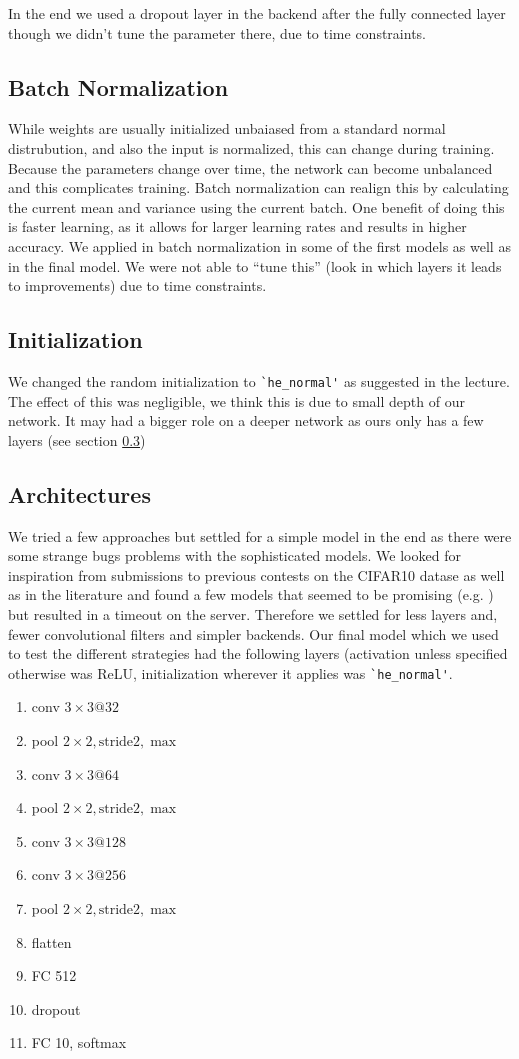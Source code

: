 In the end we used a dropout layer in the backend after the fully connected layer though we didn't tune the parameter there, due to time constraints. 
\subsection{Batch Normalization}
While weights are usually initialized unbaiased from a standard normal distrubution, and also the input is normalized, this can change during training. Because the parameters change over time, the network can become unbalanced and this complicates training.
Batch normalization can realign this by calculating the current mean and variance using the current batch. One benefit of doing this is faster learning, as it allows for larger learning rates and results in higher accuracy. We applied in batch normalization in some of the first models as well as in the final model. We were not able to ``tune this'' (look in which layers it leads to improvements) due to time constraints. 
\subsection{Initialization}
We changed the random initialization to \lstinline{`he_normal'} \cite{he} as suggested in the lecture. The effect of this was negligible, we think this is due to small depth of our network. It may had a bigger role on a deeper network as ours only has a few layers (see section \ref{sec:a})
\subsection{Architectures}\label{sec:a}
We tried a few approaches but settled for a simple model in the end as there were some strange bugs problems with the sophisticated models. We looked for inspiration from submissions to previous contests on the CIFAR10 datase as well as in the literature and found a few models that seemed to be promising  (e.g. \cite{ref})  but resulted in a timeout on the server. Therefore we settled for less layers and, fewer convolutional filters and simpler backends. 
Our final model which we used to test the different strategies had the following layers (activation unless specified otherwise was ReLU, initialization wherever it applies was \lstinline{`he_normal'}.
\begin{enumerate}
\item conv $3\times 3@32$
\item pool $2\times 2, \text{stride} 2, \max$
\item conv $3\times 3@64$
\item pool $2\times 2, \text{stride} 2, \max$
\item conv $3\times 3@128$
\item conv $3\times 3@256$
\item pool $2\times 2, \text{stride} 2, \max$
\item flatten
\item FC 512
\item dropout
\item FC 10, softmax
\end{enumerate}

